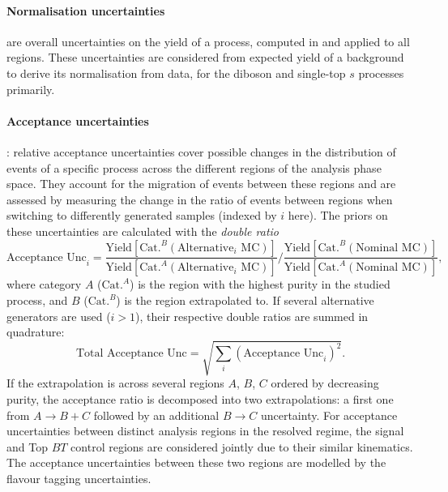 \paragraph{Normalisation uncertainties} are overall uncertainties on the yield of a process, computed in and applied to all regions. These uncertainties are considered from expected yield of a background to derive its normalisation from data, for the diboson and single-top $s$ processes primarily.

\paragraph{Acceptance uncertainties}: relative acceptance uncertainties cover possible changes in the distribution of events of a specific process across the different regions of the analysis phase space. They account for the migration of events between these regions and are assessed by measuring the change in the ratio of events between regions when switching to differently generated samples (indexed by $i$ here). The priors on these uncertainties are calculated with the \textit{double ratio} 
\begin{equation}\label{eq-doubleRatio}
    \text{Acceptance Unc}_i = \frac{\text{Yield}[\text{Cat.}^B (\mathrm{Alternative}_i\mathrm{\,\,MC})]}{\text{Yield}[\text{Cat.}^A (\mathrm{Alternative}_i\mathrm{\,\,MC})]} \Bigg/ \frac{\text{Yield}[\text{Cat.}^B (\mathrm{Nominal\,\,MC})]}{\text{Yield}[\text{Cat.}^A (\mathrm{Nominal\,\,MC})]},
\end{equation}
where category $A$ ($\text{Cat.}^A$) is the region with the highest purity in the studied process, and $B$ ($\text{Cat.}^B$) is the region extrapolated to. If several alternative generators are used ($i > 1$), their respective double ratios are summed in quadrature: \[ \text{Total Acceptance Unc} = \sqrt{\sum_i\left(\text{Acceptance Unc}_i\right)^2}.\] If the extrapolation is across several regions $A$, $B$, $C$ ordered by decreasing purity, the acceptance ratio is decomposed into two extrapolations: a first one from $A \rightarrow B+C$ followed by an additional $B \rightarrow C$ uncertainty. For acceptance uncertainties between distinct analysis regions in the resolved regime, the signal and Top $BT$ control regions are considered jointly due to their similar kinematics. The acceptance uncertainties between these two regions are modelled by the flavour tagging uncertainties.

